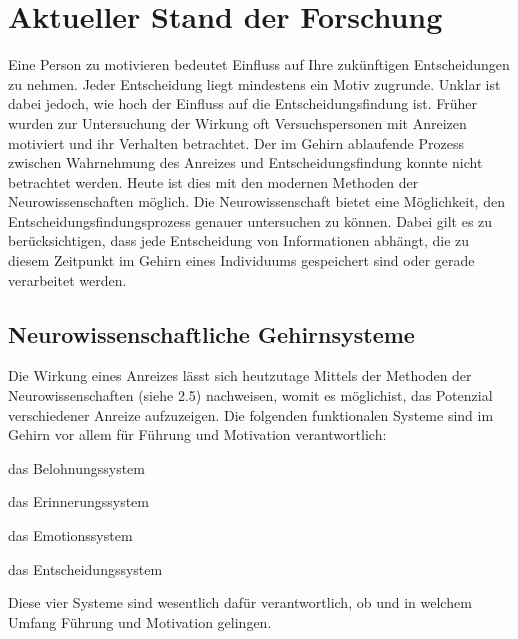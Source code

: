 \section{Aktueller Stand der Forschung}
Eine Person zu motivieren bedeutet Einfluss auf Ihre zukünftigen Entscheidungen zu nehmen. Jeder Entscheidung liegt mindestens ein Motiv zugrunde. Unklar ist dabei jedoch, wie hoch der Einfluss auf die Entscheidungsfindung ist. Früher wurden zur Untersuchung der Wirkung oft Versuchspersonen mit Anreizen motiviert und ihr Verhalten betrachtet. Der im Gehirn ablaufende Prozess zwischen Wahrnehmung des Anreizes und Entscheidungsfindung konnte nicht betrachtet werden. Heute ist dies mit den modernen Methoden der Neurowissenschaften möglich. \citep[S. 59]{Nowka.2013}
Die Neurowissenschaft bietet eine Möglichkeit, den Entscheidungsfindungsprozess genauer untersuchen zu können. Dabei gilt es zu berücksichtigen, dass jede Entscheidung von Informationen abhängt, die zu diesem Zeitpunkt im Gehirn eines Individuums gespeichert sind oder gerade verarbeitet werden. \citep[S. 60]{Nowka.2013}

\subsection{Neurowissenschaftliche Gehirnsysteme}
Die Wirkung eines Anreizes lässt sich heutzutage Mittels der Methoden der Neurowissenschaften (siehe 2.5) nachweisen, womit es möglichist, das Potenzial verschiedener Anreize aufzuzeigen. Die folgenden funktionalen Systeme sind im Gehirn vor allem für Führung und Motivation verantwortlich: 

\begin{APAitemize}
\item das Belohnungssystem
\item das Erinnerungssystem
\item das Emotionssystem
\item das Entscheidungssystem
\end{APAitemize}

\glqq Diese vier Systeme sind wesentlich dafür verantwortlich, ob und in welchem Umfang Führung und Motivation gelingen.\grqq \citep[S. 16]{Seelbach.2011}

